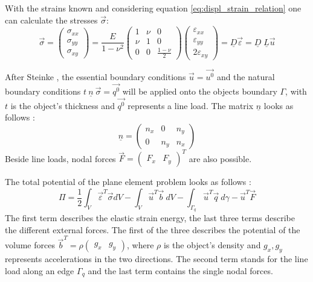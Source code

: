   With the strains known and considering equation \eqref{eq:displ_strain_relation} one can calculate the stresses $\vec{\sigma}$:
  \begin{equation}\label{eq:sigma=D*eps}
  \vec{\sigma} = \begin{pmatrix}
  \sigma_{xx} \\
  \sigma_{yy} \\
  \sigma_{xy}
  \end{pmatrix} = \frac{E}{1-\nu^2} \begin{pmatrix}
  1 & \nu & 0 \\
  \nu & 1 & 0 \\
  0 & 0 & \frac{1-\nu}{2}
  \end{pmatrix} \begin{pmatrix}
  \varepsilon_{xx} \\
  \varepsilon_{yy} \\
  2\varepsilon_{xy}
  \end{pmatrix} = \underline{D} \vec{\varepsilon} = \underline{D}\; \underline{L} \vec{u}
  \end{equation}

  After Steinke \cite{steinke2005finite}, the essential boundary conditions $\vec{u} = \vec{u^0}$ and the natural boundary conditions $t\ \underline{n}\ \vec{\sigma} = \vec{q^0}$ will be applied onto the objects boundary $\Gamma$, with $t$ is the object's thickness and $\vec{q^0}$ represents a line load. The matrix $\underline{n}$ looks as follows \cite{steinke2005finite}:
  \begin{equation}
  \underline{n} = \begin{pmatrix}
  n_x & 0 & n_y\\ 0 & n_y & n_x
  \end{pmatrix}
  \end{equation}
  Beside line loads, nodal forces $\vec{F} = \begin{pmatrix}
  F_x & F_y
  \end{pmatrix}^T$ are also possible.
  
  The total potential of the plane element problem looks as follows \cite{steinke2005finite}:
  \begin{equation}
  \Pi = \frac{1}{2} \int_{V}\vec{\varepsilon}^T\vec{\sigma}dV - \int_{V} \vec{u}^T \vec{b}\ dV - \int_{\Gamma_q}\vec{u}^T \vec{q}\ d\gamma -\vec{u}^T \vec{F}
  \end{equation}
  The first term describes the elastic strain energy, the last three terms describe the different external forces. The first of the three describes the potential of the volume forces $\vec{b}^T = \rho \begin{pmatrix}
  g_x & g_y
  \end{pmatrix}$, where $\rho$ is the object's density and $g_x, g_y$ represents accelerations in the two directions. The second term stands for the line load along an edge $\Gamma_q$ and the last term contains the single nodal forces.
  
